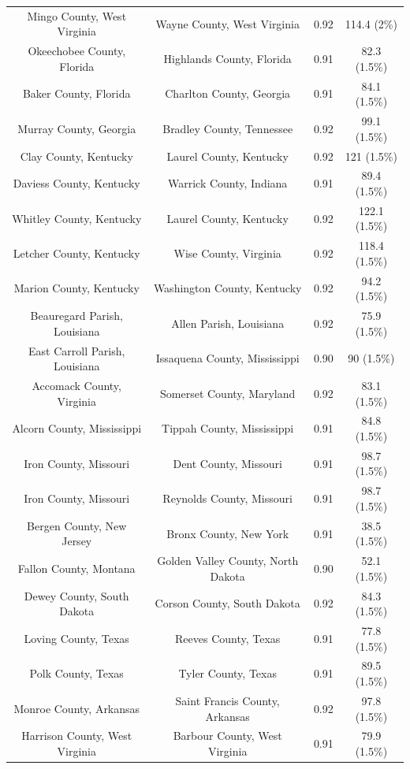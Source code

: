 \begin{longtable}{cccc}
  Mingo County, West Virginia & Wayne County, West Virginia & 0.92 & 114.4 (2\%) \\ 
  Okeechobee County, Florida & Highlands County, Florida & 0.91 & 82.3 (1.5\%) \\ 
  Baker County, Florida & Charlton County, Georgia & 0.91 & 84.1 (1.5\%) \\ 
  Murray County, Georgia & Bradley County, Tennessee & 0.92 & 99.1 (1.5\%) \\ 
  Clay County, Kentucky & Laurel County, Kentucky & 0.92 & 121 (1.5\%) \\ 
  Daviess County, Kentucky & Warrick County, Indiana & 0.91 & 89.4 (1.5\%) \\ 
  Whitley County, Kentucky & Laurel County, Kentucky & 0.92 & 122.1 (1.5\%) \\ 
  Letcher County, Kentucky & Wise County, Virginia & 0.92 & 118.4 (1.5\%) \\ 
  Marion County, Kentucky & Washington County, Kentucky & 0.92 & 94.2 (1.5\%) \\ 
  Beauregard Parish, Louisiana & Allen Parish, Louisiana & 0.92 & 75.9 (1.5\%) \\ 
  East Carroll Parish, Louisiana & Issaquena County, Mississippi & 0.90 & 90 (1.5\%) \\ 
  Accomack County, Virginia & Somerset County, Maryland & 0.92 & 83.1 (1.5\%) \\ 
  Alcorn County, Mississippi & Tippah County, Mississippi & 0.91 & 84.8 (1.5\%) \\ 
  Iron County, Missouri & Dent County, Missouri & 0.91 & 98.7 (1.5\%) \\ 
  Iron County, Missouri & Reynolds County, Missouri & 0.91 & 98.7 (1.5\%) \\ 
  Bergen County, New Jersey & Bronx County, New York & 0.91 & 38.5 (1.5\%) \\ 
  Fallon County, Montana & Golden Valley County, North Dakota & 0.90 & 52.1 (1.5\%) \\ 
  Dewey County, South Dakota & Corson County, South Dakota & 0.92 & 84.3 (1.5\%) \\ 
  Loving County, Texas & Reeves County, Texas & 0.91 & 77.8 (1.5\%) \\ 
  Polk County, Texas & Tyler County, Texas & 0.91 & 89.5 (1.5\%) \\ 
  Monroe County, Arkansas & Saint Francis County, Arkansas & 0.92 & 97.8 (1.5\%) \\ 
  Harrison County, West Virginia & Barbour County, West Virginia & 0.91 & 79.9 (1.5\%) \\ 

\end{longtable}
